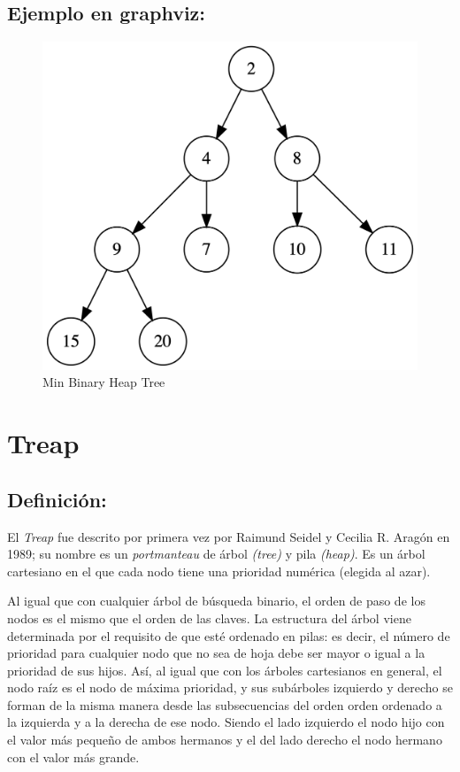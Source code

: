 \documentclass[]{article}
\begin{document}
	\subsection{Ejemplo en graphviz:}
		\begin{figure}[H]
			\centering\includegraphics[width=\textwidth]{graphviz/minBinaryHeapTree.png}
			\caption{Min Binary Heap Tree}
			\label{fig:Min Binary Heap Tree}
		\end{figure}
	

\section{Treap}
	\subsection{Definición:}
		\par El \textit{Treap} fue descrito por primera vez por Raimund Seidel y Cecilia R. Aragón en 1989\cite{symposiumonfoundationsofcomputerscience30thAnnualSymposium1989}; su nombre es un \textit{portmanteau} de árbol \textit{(tree)} y pila \textit{(heap)}. Es un árbol cartesiano en el que cada nodo tiene una prioridad numérica (elegida al azar). 
		
		\par Al igual que con cualquier árbol de búsqueda binario, el orden de paso de los nodos es el mismo que el orden  de las claves. La estructura del árbol viene determinada por el requisito de que esté ordenado en pilas: es decir, el número de prioridad para cualquier nodo que no sea de hoja debe ser mayor o igual a la prioridad de sus hijos. Así, al igual que con los árboles cartesianos en general, el nodo raíz es el nodo de máxima prioridad, y sus subárboles izquierdo y derecho se forman de la misma manera desde las subsecuencias del orden orden ordenado a la izquierda y a la derecha de ese nodo. Siendo el lado izquierdo el nodo hijo con el valor más pequeño de ambos hermanos y el del lado derecho el nodo hermano con el valor más grande.
\end{document}
